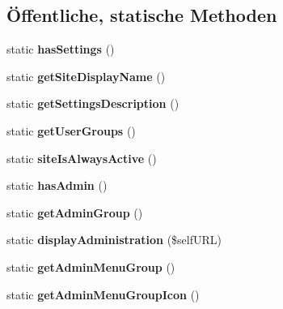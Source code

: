 \subsection*{Öffentliche, statische Methoden}
\begin{DoxyCompactItemize}
\item 
\mbox{\label{classaufeinenblick_a933403cf1f23c3758348969e272293cd}} 
static {\bfseries has\+Settings} ()
\item 
\mbox{\label{classaufeinenblick_a71119a42644656b95a97696a412bda49}} 
static {\bfseries get\+Site\+Display\+Name} ()
\item 
\mbox{\label{classaufeinenblick_a1fbd29b172944c505404512c55690858}} 
static {\bfseries get\+Settings\+Description} ()
\item 
\mbox{\label{classaufeinenblick_a151d08f74950bbc90a39d108fd600c1f}} 
static {\bfseries get\+User\+Groups} ()
\item 
\mbox{\label{classaufeinenblick_aececd09890c2f1d215b439a3025f6780}} 
static {\bfseries site\+Is\+Always\+Active} ()
\item 
\mbox{\label{classaufeinenblick_a67e294e8d9b71f075f6666e60139d1cd}} 
static {\bfseries has\+Admin} ()
\item 
\mbox{\label{classaufeinenblick_a34bfb82e7077942dcfbbf6c27371ce1b}} 
static {\bfseries get\+Admin\+Group} ()
\item 
\mbox{\label{classaufeinenblick_af209c1fcd38bfe2a89052d0261560d5a}} 
static {\bfseries display\+Administration} (\$self\+U\+RL)
\item 
\mbox{\label{classaufeinenblick_aadecd4efdadd220379ec667d74feccee}} 
static {\bfseries get\+Admin\+Menu\+Group} ()
\item 
\mbox{\label{classaufeinenblick_a08f7e0754e21ae874cb19f640bfcb15b}} 
static {\bfseries get\+Admin\+Menu\+Group\+Icon} ()
\item 
\mbox{\label{classaufeinenblick_a933403cf1f23c3758348969e272293cd}} 

\end{DoxyCompactItemize}
